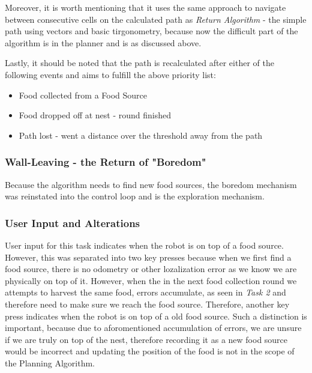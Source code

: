 \documentclass[11pt, a4paper]{article}
\begin{document}
Moreover, it is worth mentioning that it uses the same approach to navigate between consecutive cells on the calculated path as \textit{Return Algorithm}\cite{task2_report} - the simple path using vectors and basic tirgonometry, because now the difficult part of the algorithm is in the planner and is as discussed above. 

Lastly, it should be noted that the path is recalculated after either of the following events and aims to fulfill the above priority list:

\begin{itemize}

	\item Food collected from a Food Source
	\item Food dropped off at nest - round finished
	\item Path lost - went a distance over the threshold away from the path

\end{itemize}



\subsubsection{Wall-Leaving - the Return of "Boredom"}

Because the algorithm needs to find new food sources, the boredom mechanism \cite{task1_report} was reinstated into the control loop and is the exploration mechanism. 

\subsubsection{User Input and Alterations}

User input for this task indicates when the robot is on top of a food source. However, this was separated into two key presses because when we first find a food source, there is no odometry or other lozalization error as we know we are physically on top of it. However, when the in the next food collection round we attempts to harvest the same food, errors accumulate, as seen in \textit{Task 2}\cite{task2_report} and therefore need to make sure we reach the food source. Therefore, another key press indicates when the robot is on top of a old food source. Such a distinction is important, because due to aforomentioned accumulation of errors, we are unsure if we are truly on top of the nest, therefore recording it as a new food source would be incorrect and updating the position of the food is not in the scope of the Planning Algorithm. 
\end{document}
